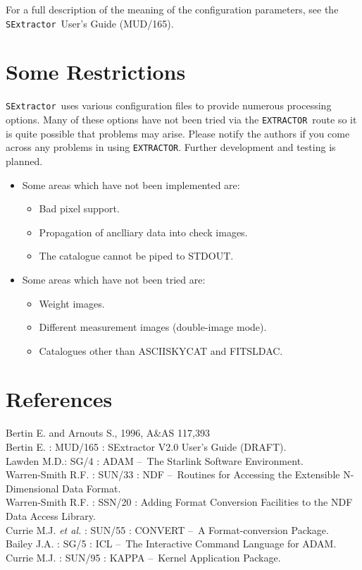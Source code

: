 \documentclass[twoside,11pt]{article}
\newcommand{\htmladdnormallink}[2]{#1}
\newcommand{\latex}[1]{#1}
\newcommand{\xref}[3]{#1}
\newcommand{\xlabel}[1]{}
\renewcommand{\_}{\texttt{\symbol{95}}}
\newcommand{\EXTRACTOR}{\texttt{EXTRACTOR}}
\newcommand{\SExtractor}{\texttt{SExtractor}}
\newcommand{\MUD}{mud165.ps}
\newcommand{\dash}{--}
\newcommand{\dash}{-}
\begin{document}
For a full description of the meaning of the configuration parameters, see 
the 
\htmladdnormallink{\SExtractor\ User's Guide}{\MUD}\latex{ (MUD/165)}.

\section{\xlabel{some_restrictions}\label{some_restrictions}Some Restrictions}
\SExtractor\ uses various configuration files to provide numerous processing
options.
Many of these options have not been tried via the \EXTRACTOR\ route so it is
quite possible that problems may arise. Please notify the authors if you
come across any problems in using \EXTRACTOR. Further development and testing
is planned.

\begin{itemize}
\item Some areas which have not been implemented are:
\begin{itemize}
 \item Bad pixel support.
 \item Propagation of anclliary data into check images.
 \item The catalogue cannot be piped to STDOUT.
\end{itemize}
\item Some areas which have not been tried are:
\begin{itemize}
 \item Weight images.
 \item Different measurement images (double-image mode).
 \item Catalogues other than ASCII\_SKYCAT and FITS\_LDAC.
\end{itemize}
\end{itemize}

\section{References}
Bertin E. and Arnouts S., 1996, A\&AS 117,393\\
Bertin E. : MUD/165 : 
SExtractor V2.0 User's Guide (DRAFT).\\
Lawden M.D.: \xref{SG/4}{sg4}{} : 
ADAM \dash\ The Starlink Software Environment.\\
Warren-Smith R.F. : \xref{SUN/33}{sun33}{} : 
NDF \dash\ Routines for Accessing the Extensible
N-Dimensional Data Format.\\
Warren-Smith R.F. : \xref{SSN/20}{ssn20}{} : 
Adding Format Conversion Facilities to the NDF Data
Access Library.\\
Currie M.J. \textit{et al.} : \xref{SUN/55}{sun55}{} : 
CONVERT \dash\ A Format-conversion Package.\\
Bailey J.A. : \xref{SG/5}{sg5}{} : 
ICL \dash\ The Interactive Command Language for ADAM.\\
Currie M.J. : \xref{SUN/95}{sun95}{} : 
KAPPA \dash\ Kernel Application Package.
\end{document}
